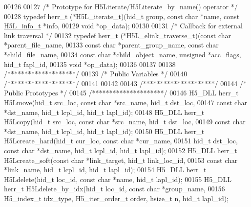\begin{DoxyCode}
00126 
00127 \textcolor{comment}{/* Prototype for H5Literate/H5Literate\_by\_name() operator */}
00128 \textcolor{keyword}{typedef} herr\_t (*H5L\_iterate\_t)(hid\_t group, \textcolor{keyword}{const} \textcolor{keywordtype}{char} *name, \textcolor{keyword}{const} \hyperlink{struct_h5_l__info__t}{H5L\_info\_t} *info,
00129     \textcolor{keywordtype}{void} *op\_data);
00130 
00131 \textcolor{comment}{/* Callback for external link traversal */}
00132 \textcolor{keyword}{typedef} herr\_t (*H5L\_elink\_traverse\_t)(\textcolor{keyword}{const} \textcolor{keywordtype}{char} *parent\_file\_name,
00133     \textcolor{keyword}{const} \textcolor{keywordtype}{char} *parent\_group\_name, \textcolor{keyword}{const} \textcolor{keywordtype}{char} *child\_file\_name,
00134     \textcolor{keyword}{const} \textcolor{keywordtype}{char} *child\_object\_name, \textcolor{keywordtype}{unsigned} *acc\_flags, hid\_t fapl\_id,
00135     \textcolor{keywordtype}{void} *op\_data);
00136 
00137 
00138 \textcolor{comment}{/********************/}
00139 \textcolor{comment}{/* Public Variables */}
00140 \textcolor{comment}{/********************/}
00141 
00142 
00143 \textcolor{comment}{/*********************/}
00144 \textcolor{comment}{/* Public Prototypes */}
00145 \textcolor{comment}{/*********************/}
00146 H5\_DLL herr\_t H5Lmove(hid\_t src\_loc, \textcolor{keyword}{const} \textcolor{keywordtype}{char} *src\_name, hid\_t dst\_loc,
00147     \textcolor{keyword}{const} \textcolor{keywordtype}{char} *dst\_name, hid\_t lcpl\_id, hid\_t lapl\_id);
00148 H5\_DLL herr\_t H5Lcopy(hid\_t src\_loc, \textcolor{keyword}{const} \textcolor{keywordtype}{char} *src\_name, hid\_t dst\_loc,
00149     \textcolor{keyword}{const} \textcolor{keywordtype}{char} *dst\_name, hid\_t lcpl\_id, hid\_t lapl\_id);
00150 H5\_DLL herr\_t H5Lcreate\_hard(hid\_t cur\_loc, \textcolor{keyword}{const} \textcolor{keywordtype}{char} *cur\_name,
00151     hid\_t dst\_loc, \textcolor{keyword}{const} \textcolor{keywordtype}{char} *dst\_name, hid\_t lcpl\_id, hid\_t lapl\_id);
00152 H5\_DLL herr\_t H5Lcreate\_soft(\textcolor{keyword}{const} \textcolor{keywordtype}{char} *link\_target, hid\_t link\_loc\_id,
00153     \textcolor{keyword}{const} \textcolor{keywordtype}{char} *link\_name, hid\_t lcpl\_id, hid\_t lapl\_id);
00154 H5\_DLL herr\_t H5Ldelete(hid\_t loc\_id, \textcolor{keyword}{const} \textcolor{keywordtype}{char} *name, hid\_t lapl\_id);
00155 H5\_DLL herr\_t H5Ldelete\_by\_idx(hid\_t loc\_id, \textcolor{keyword}{const} \textcolor{keywordtype}{char} *group\_name,
00156     H5\_index\_t idx\_type, H5\_iter\_order\_t order, hsize\_t n, hid\_t lapl\_id);

\end{DoxyCode}
